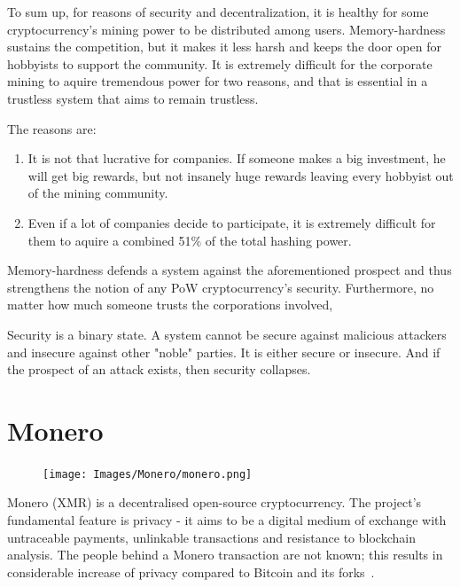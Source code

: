 To sum up, for reasons of security and decentralization, it is healthy for some cryptocurrency's mining power to be distributed among users. Memory-hardness sustains the competition, but it makes it less harsh and keeps the door open for hobbyists to support the community. It is extremely difficult for the corporate mining to aquire tremendous power for two reasons, and that is essential in a trustless system that aims to remain trustless.

\noindent The reasons are:
\begin{enumerate}[label=(\greek*)]
  \item It is not that lucrative for companies. If someone makes a big investment, he will get big rewards, but not insanely huge rewards leaving every hobbyist out of the mining community.
  \item Even if a lot of companies decide to participate, it is extremely difficult for them to aquire a combined 51\% of the total hashing power.
\end{enumerate}

Memory-hardness defends a system against the aforementioned prospect and thus strengthens the notion of any PoW cryptocurrency's security. Furthermore, no matter how much someone trusts the corporations involved,
\\
\begin{tcolorbox}[colback=red!5!white,colframe=red!75!black,title=in the words of Edward Snowden:]
  Security is a binary state. A system cannot be secure against malicious attackers and insecure against other "noble" parties. It is either secure or insecure. And if the prospect of an attack exists, then security collapses.
\end{tcolorbox}
%
\section{\label{sec:Monero}Monero}
\begin{figure}
\centering
\texttt{[image: Images/Monero/monero.png]}
\end{figure}
Monero (XMR) is a decentralised open-source cryptocurrency. The project's fundamental feature is privacy - it aims to be a digital medium of exchange with untraceable payments, unlinkable transactions and resistance to blockchain analysis. The people behind a Monero transaction are not known; this results in considerable increase of privacy compared to Bitcoin and its forks~\cite{monerodef}.

